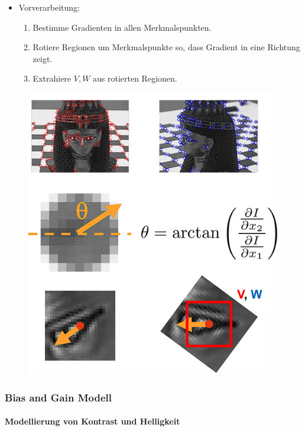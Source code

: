 \documentclass[12pt, a4paper, oneside]{article}
\begin{document}
\begin{itemize}
  \item Vorverarbeitung:
    \begin{enumerate}
      \item Bestimme Gradienten in allen Merkmalspunkten.
      \item Rotiere Regionen um Merkmalspunkte so, dass Gradient in eine Richtung zeigt.
      \item Extrahiere $V,W$ aus rotierten Regionen.
    \end{enumerate}
\end{itemize}
\begin{figure}[htbp]
    \centering
    \includegraphics[scale=1]{../img/1-18.png}
    \label{img/1-18}
\end{figure}

\subsubsection{Bias and Gain Modell}
\paragraph*{Modellierung von Kontrast und Helligkeit}
\end{document}

